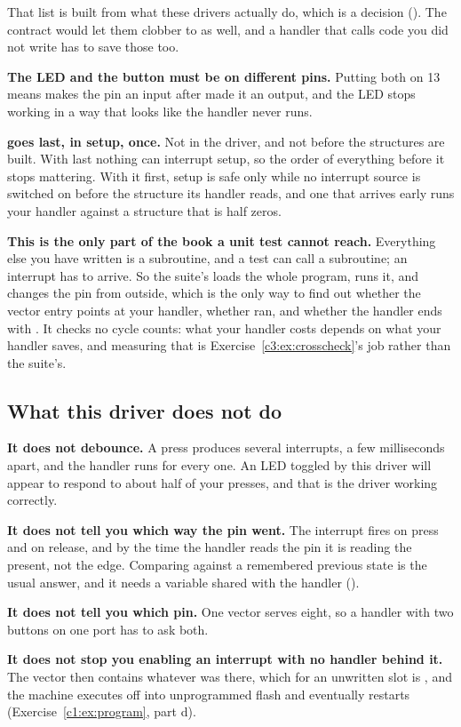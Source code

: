 That list is built from what these drivers actually do, which is a decision
(). The contract would let them clobber  to  as well,
and a handler that calls code you did not write has to save those too.

\textbf{The LED and the button must be on different pins.} Putting both on 13 means
 makes the pin an input after  made it an output, and the LED stops
working in a way that looks like the handler never runs.

\textbf{ goes last, in setup, once.} Not in the driver, and not before the structures
are built. With  last nothing can interrupt setup, so the order of everything before it
stops mattering. With it first, setup is safe only while no interrupt source is switched on before
the structure its handler reads, and one that arrives early runs your handler against a structure
that is half zeros.

\textbf{This is the only part of the book a unit test cannot reach.} Everything else you have
written is a subroutine, and a test can call a subroutine; an interrupt has to arrive. So the
suite's  loads the whole program, runs it, and changes the pin from outside,
which is the only way to find out whether the vector entry points at your handler, whether
 ran, and whether the handler ends with . It checks no cycle counts: what your
handler costs depends on what your handler saves, and measuring that is
Exercise~\ref{c3:ex:crosscheck}'s job rather than the suite's.

\subsection{What this driver does not do}
\label{c3:sec:notdo}
\textbf{It does not debounce.} A press produces several interrupts, a few milliseconds apart, and
the handler runs for every one. An LED toggled by this driver will appear to respond to about half
of your presses, and that is the driver working correctly.

\textbf{It does not tell you which way the pin went.} The interrupt fires on press and on release,
and by the time the handler reads the pin it is reading the present, not the edge. Comparing
against a remembered previous state is the usual answer, and it needs a variable shared with the
handler ().

\textbf{It does not tell you which pin.} One vector serves eight, so a handler with two buttons on
one port has to ask both.

\textbf{It does not stop you enabling an interrupt with no handler behind it.} The vector then
contains whatever was there, which for an unwritten slot is , and the machine executes
off into unprogrammed flash and eventually restarts (Exercise~\ref{c1:ex:program}, part d).
